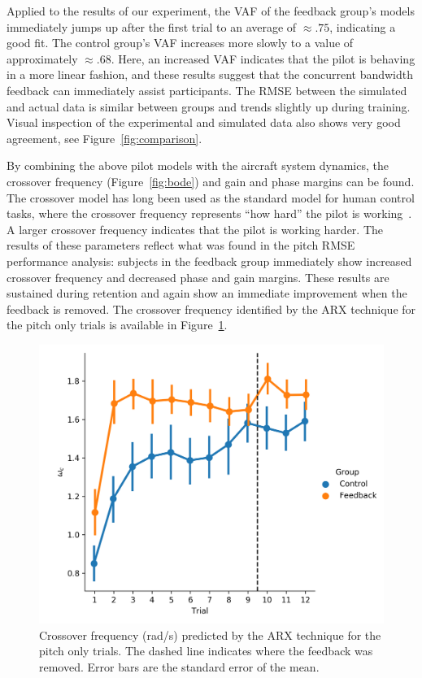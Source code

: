 Applied to the results of our experiment, the VAF of the feedback group's models immediately jumps up after the first trial to an average of $\approx.75$, indicating a good fit.
The control group's VAF increases more slowly to a value of approximately $\approx.68$.
Here, an increased VAF indicates that the pilot is behaving in a more linear fashion, and these results suggest that the concurrent bandwidth feedback can immediately assist participants.
The RMSE between the simulated and actual data is similar between groups and trends slightly up during training.
Visual inspection of the experimental and simulated data also shows very good agreement, see Figure~\ref{fig:comparison}.

By combining the above pilot models with the aircraft system dynamics, the crossover frequency (Figure~\ref{fig:bode}) and gain and phase margins can be found.
The crossover model has long been used as the standard model for human control tasks, where the crossover frequency represents ``how hard'' the pilot is working~\citep{mcruer_dynamic_1957}.
A larger crossover frequency indicates that the pilot is working harder.
The results of these parameters reflect what was found in the pitch RMSE performance analysis: subjects in the feedback group immediately show increased crossover frequency and decreased phase and gain margins.
These results are sustained during retention and again show an immediate improvement when the feedback is removed.
The crossover frequency identified by the ARX technique for the pitch only trials is available in Figure~\ref{fig:arx_crossover}.

\begin{figure}[tb]
    \centering
    \includegraphics[width=0.8\linewidth]{figures/Modeling/wc_arx.png}
    \caption[Crossover frequency (ARX)]{Crossover frequency (rad/s) predicted by the ARX technique for the pitch only trials.
        The dashed line indicates where the feedback was removed.
        Error bars are the standard error of the mean.}
    \label{fig:arx_crossover}
\end{figure}

